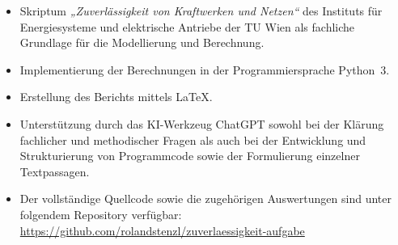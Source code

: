 \documentclass[a4paper,12pt]{article}
\begin{document}
\begin{itemize}
    \item Skriptum \emph{„Zuverlässigkeit von Kraftwerken und Netzen“}
    des Instituts für Energiesysteme und elektrische Antriebe der TU Wien
    als fachliche Grundlage für die Modellierung und Berechnung.

    \item Implementierung der Berechnungen in der Programmiersprache
    Python~3.

    \item Erstellung des Berichts mittels \LaTeX.

    \item Unterstützung durch das KI-Werkzeug ChatGPT sowohl bei der
    Klärung fachlicher und methodischer Fragen als auch bei der
    Entwicklung und Strukturierung von Programmcode sowie der
    Formulierung einzelner Textpassagen.

    \item Der vollständige Quellcode sowie die zugehörigen Auswertungen
    sind unter folgendem Repository verfügbar: \\
    \url{https://github.com/rolandstenzl/zuverlaessigkeit-aufgabe}
\end{itemize}
\end{document}
